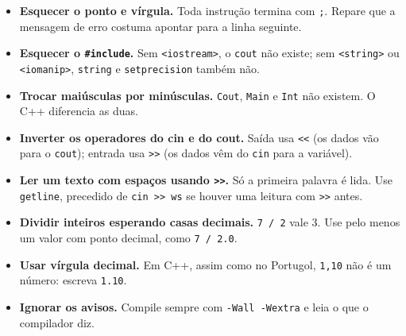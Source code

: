 \begin{itemize}
  \item \textbf{Esquecer o ponto e vírgula.} Toda instrução termina com \texttt{;}. Repare que a mensagem de erro costuma apontar para a linha seguinte.
  \item \textbf{Esquecer o \texttt{\#include}.} Sem \texttt{<iostream>}, o \texttt{cout} não existe; sem \texttt{<string>} ou \texttt{<iomanip>}, \texttt{string} e \texttt{setprecision} também não.
  \item \textbf{Trocar maiúsculas por minúsculas.} \texttt{Cout}, \texttt{Main} e \texttt{Int} não existem. O C++ diferencia as duas.
  \item \textbf{Inverter os operadores do cin e do cout.} Saída usa \texttt{<<} (os dados vão para o \texttt{cout}); entrada usa \texttt{>>} (os dados vêm do \texttt{cin} para a variável).
  \item \textbf{Ler um texto com espaços usando \texttt{>>}.} Só a primeira palavra é lida. Use \texttt{getline}, precedido de \texttt{cin >> ws} se houver uma leitura com \texttt{>>} antes.
  \item \textbf{Dividir inteiros esperando casas decimais.} \texttt{7 / 2} vale 3. Use pelo menos um valor com ponto decimal, como \texttt{7 / 2.0}.
  \item \textbf{Usar vírgula decimal.} Em C++, assim como no Portugol, \texttt{1,10} não é um número: escreva \texttt{1.10}.
  \item \textbf{Ignorar os avisos.} Compile sempre com \texttt{-Wall -Wextra} e leia o que o compilador diz.
\end{itemize}
